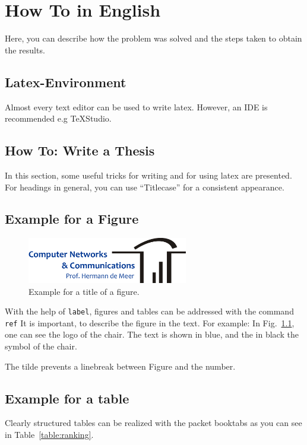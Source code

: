 
\chapter{How To in English}
Here, you can describe how the problem was solved and the steps taken to obtain the results.

\section{Latex-Environment}
Almost every text editor can be used to write latex. However, an IDE is recommended e.g TeXStudio.


\section{How To: Write a Thesis}
In this section, some useful tricks for writing and for using latex are presented.
For headings in general, you can use ``Titlecase'' for a consistent appearance.

\section{Example for a Figure}
	\begin{figure}[h!]
		\begin{center}
			\includegraphics[width=7cm]{img/logochair.pdf}
			\caption{Example for a title of a figure.}
			\label{fig:ToUseWithReference}
		\end{center}
	\end{figure}
	
	With the help of \texttt{\bslash label}, figures and tables can be addressed with the command \texttt{\bslash ref} 
	It is important, to describe the figure in the text. For example: In Fig.~\ref{fig:ToUseWithReference}, one can see the logo of the chair. The text is shown in blue, and the in black the symbol of the chair.
	
	The tilde prevents a linebreak between Figure and the number.
	
	\section{Example for a table}
	Clearly structured tables can be realized with the packet booktabs as you can see in Table~\ref{table:ranking}.
	
